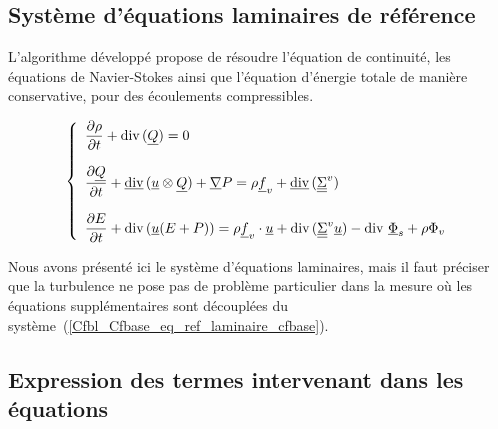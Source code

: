 \subsection*{Système d'équations laminaires de référence}

L'algorithme développé propose de résoudre
l'équation de continuité, les équations de Navier-Stokes
ainsi que l'équation d'énergie totale de manière conservative,
pour des écoulements compressibles.

\begin{equation}\label{Cfbl_Cfbase_eq_ref_laminaire_cfbase}
\left\{\begin{array}{l}

\displaystyle\frac{\partial\rho}{\partial t} + \text{div}\,(\underline{Q}) = 0 \\
\\
\displaystyle\frac{\partial\underline{Q}}{\partial t}
+ \underline{\text{div}}\,(\underline{u} \otimes \underline{Q}) + \underline{\nabla}{P}
= \rho \underline{f}_v + \underline{\text{div}}\,(\underline{\underline{\Sigma}}^v) \\
\\
\displaystyle\frac{\partial E}{\partial t} + \text{div}\,( \underline{u} (E+P) )
= \rho\underline{f}_v\cdot\underline{u} + \text{div}\,(\underline{\underline{\Sigma}}^v \underline{u})
- \text{div}\,{\,\underline{\Phi}_s} + \rho\Phi_v

\end{array}\right.
\end{equation}

Nous avons présenté ici le système d'équations laminaires, mais il faut préciser
que la turbulence ne pose pas de problème particulier dans la mesure où les
équations supplémentaires sont découplées du système~(\ref{Cfbl_Cfbase_eq_ref_laminaire_cfbase}).

\subsection*{Expression des termes intervenant dans les équations}

